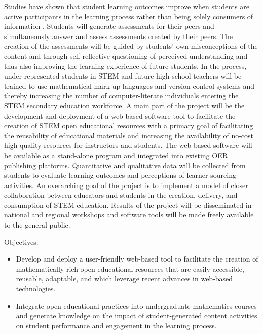 \documentclass[11pt]{article}
\begin{document}
Studies have shown that student learning outcomes improve when students are active participants in the learning process rather than being solely consumers of information \cite{SF-SE-MM:14}.  Students will generate assessments for their peers and simultaneously answer and assess assessments created by their peers. The creation of the assessments will be guided by students' own misconceptions of the content and through self-reflective questioning of perceived understanding and thus also improving the learning experience of future students.  In the process, under-represented students in STEM and future high-school teachers will be trained to use mathematical mark-up languages and version control systems and thereby increasing the number of computer-literate individuals entering the STEM secondary education workforce.  A main part of the project will be the development and deployment of a web-based software tool to facilitate the creation of STEM open educational resources with a primary goal of facilitating the reusability of educational materials and increasing the availability of no-cost high-quality resources for instructors and students. The web-based software will be available as a stand-alone program and integrated into existing OER publishing platforms. Quantitative and qualitative data will be collected from students to evaluate learning outcomes and perceptions of learner-sourcing activities.  An overarching goal of the project is to implement a model of closer collaboration between educators and students in the creation, delivery, and consumption of STEM education.  Results of the project will be disseminated in national and regional workshops and software tools will be made freely available to the general public.

Objectives:
\begin{itemize}
  \item Develop and deploy a user-friendly web-based tool to facilitate the creation of mathematically rich open educational resources that are easily accessible, reusable, adaptable, and which leverage recent advances in web-based technologies.
  \item Integrate open educational practices into undergraduate mathematics courses and generate knowledge on the impact of student-generated content activities on student performance and engagement in the learning process.
\end{itemize}
\end{document}
